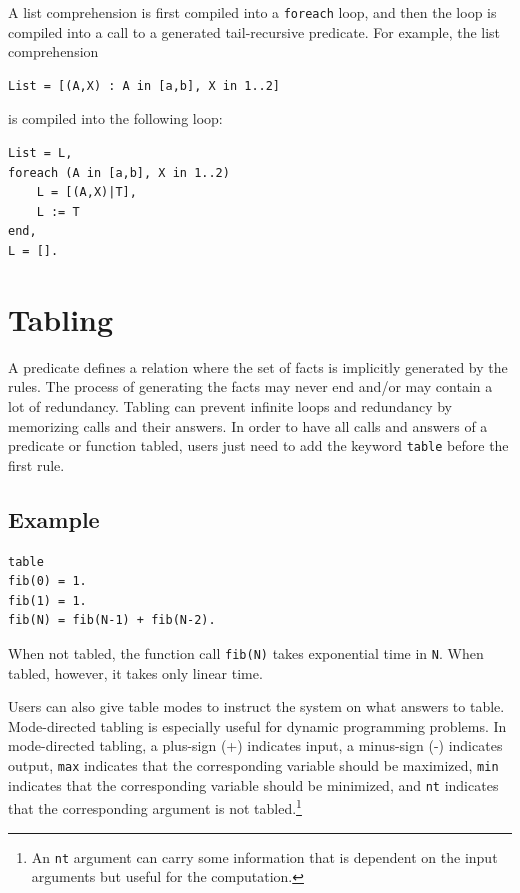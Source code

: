 A list comprehension is first compiled into a \texttt{foreach} loop, and then the loop is compiled into a call to a generated tail-recursive predicate. For example, the list comprehension 
\begin{verbatim}
List = [(A,X) : A in [a,b], X in 1..2]
\end{verbatim}
is compiled into the following loop:
\begin{verbatim}
List = L,
foreach (A in [a,b], X in 1..2)
    L = [(A,X)|T],
    L := T
end,
L = [].
\end{verbatim}

\section{Tabling}
A predicate defines a relation where the set of facts is implicitly generated by the rules. The process of generating the facts may never end and/or may contain a lot of redundancy. Tabling can prevent infinite loops and redundancy by memorizing calls and their answers. In order to have all calls and answers of a predicate or function tabled, users just need to add the keyword \texttt{table} before the first rule.

\subsection*{Example}
\begin{verbatim}
table
fib(0) = 1.
fib(1) = 1.
fib(N) = fib(N-1) + fib(N-2).
\end{verbatim}
When not tabled, the function call \texttt{fib(N)} takes exponential time in \texttt{N}. When tabled, however, it takes only linear time.

Users can also give table modes to instruct the system on what answers to table. Mode-directed tabling is especially useful for dynamic programming problems. In mode-directed tabling, a plus-sign (+) indicates input, a minus-sign (-) indicates output, \texttt{max} indicates that the corresponding variable should be maximized, \texttt{min} indicates that the corresponding variable should be minimized, and \texttt{nt} indicates that the corresponding argument is not tabled.\footnote{An {\tt nt} argument can carry some information that is dependent on the input arguments but useful for the computation.}

